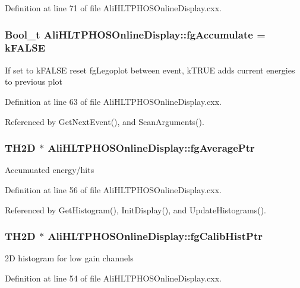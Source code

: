 Definition at line 71 of file Ali\-HLTPHOSOnline\-Display.cxx.
\subsubsection{\setlength{\rightskip}{0pt plus 5cm}Bool\_\-t {\bf Ali\-HLTPHOSOnline\-Display::fg\-Accumulate} = k\-FALSE\hspace{0.3cm}{\tt  [static, private]}}\label{classAliHLTPHOSOnlineDisplay_v57}


If set to k\-FALSE reset fg\-Legoplot between event, k\-TRUE adds current energies to previous plot 

Definition at line 63 of file Ali\-HLTPHOSOnline\-Display.cxx.

Referenced by Get\-Next\-Event(), and Scan\-Arguments().
\subsubsection{\setlength{\rightskip}{0pt plus 5cm}TH2D $\ast$ {\bf Ali\-HLTPHOSOnline\-Display::fg\-Average\-Ptr}\hspace{0.3cm}{\tt  [static, private]}}\label{classAliHLTPHOSOnlineDisplay_v42}


Accumuated energy/hits 

Definition at line 56 of file Ali\-HLTPHOSOnline\-Display.cxx.

Referenced by Get\-Histogram(), Init\-Display(), and Update\-Histograms().
\subsubsection{\setlength{\rightskip}{0pt plus 5cm}TH2D $\ast$ {\bf Ali\-HLTPHOSOnline\-Display::fg\-Calib\-Hist\-Ptr}\hspace{0.3cm}{\tt  [static, private]}}\label{classAliHLTPHOSOnlineDisplay_v40}


2D histogram for low gain channels 

Definition at line 54 of file Ali\-HLTPHOSOnline\-Display.cxx.

